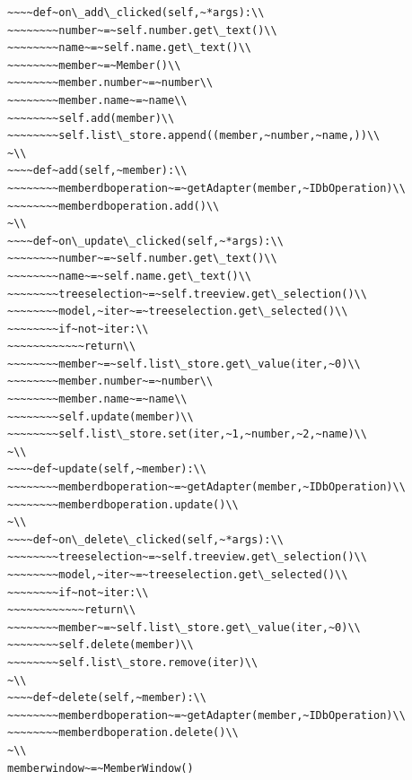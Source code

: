 \documentclass[a4paper,openany,twoside,draft]{book}
\begin{document}
\begin{verbatim}
~~~~def~on\_add\_clicked(self,~*args):\\
~~~~~~~~number~=~self.number.get\_text()\\
~~~~~~~~name~=~self.name.get\_text()\\
~~~~~~~~member~=~Member()\\
~~~~~~~~member.number~=~number\\
~~~~~~~~member.name~=~name\\
~~~~~~~~self.add(member)\\
~~~~~~~~self.list\_store.append((member,~number,~name,))\\
~\\
~~~~def~add(self,~member):\\
~~~~~~~~memberdboperation~=~getAdapter(member,~IDbOperation)\\
~~~~~~~~memberdboperation.add()\\
~\\
~~~~def~on\_update\_clicked(self,~*args):\\
~~~~~~~~number~=~self.number.get\_text()\\
~~~~~~~~name~=~self.name.get\_text()\\
~~~~~~~~treeselection~=~self.treeview.get\_selection()\\
~~~~~~~~model,~iter~=~treeselection.get\_selected()\\
~~~~~~~~if~not~iter:\\
~~~~~~~~~~~~return\\
~~~~~~~~member~=~self.list\_store.get\_value(iter,~0)\\
~~~~~~~~member.number~=~number\\
~~~~~~~~member.name~=~name\\
~~~~~~~~self.update(member)\\
~~~~~~~~self.list\_store.set(iter,~1,~number,~2,~name)\\
~\\
~~~~def~update(self,~member):\\
~~~~~~~~memberdboperation~=~getAdapter(member,~IDbOperation)\\
~~~~~~~~memberdboperation.update()\\
~\\
~~~~def~on\_delete\_clicked(self,~*args):\\
~~~~~~~~treeselection~=~self.treeview.get\_selection()\\
~~~~~~~~model,~iter~=~treeselection.get\_selected()\\
~~~~~~~~if~not~iter:\\
~~~~~~~~~~~~return\\
~~~~~~~~member~=~self.list\_store.get\_value(iter,~0)\\
~~~~~~~~self.delete(member)\\
~~~~~~~~self.list\_store.remove(iter)\\
~\\
~~~~def~delete(self,~member):\\
~~~~~~~~memberdboperation~=~getAdapter(member,~IDbOperation)\\
~~~~~~~~memberdboperation.delete()\\
~\\
memberwindow~=~MemberWindow()
\end{verbatim}
\end{document}
